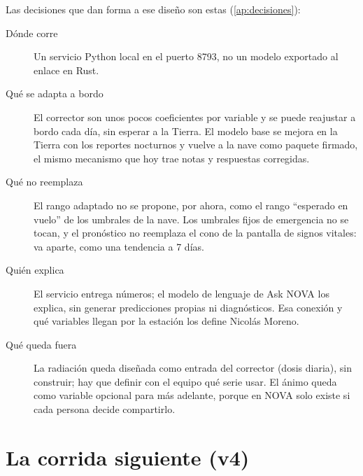 Las decisiones que dan forma a ese diseño son estas (\cref{ap:decisiones}):
\begin{description}
\item[Dónde corre] Un servicio Python local en el puerto 8793, no un modelo exportado al enlace en Rust.
\item[Qué se adapta a bordo] El corrector son unos pocos coeficientes por variable y se puede reajustar a bordo cada
  día, sin esperar a la Tierra. El modelo base se mejora en la Tierra con los reportes nocturnos y vuelve a la nave
  como paquete firmado, el mismo mecanismo que hoy trae notas y respuestas corregidas.
\item[Qué no reemplaza] El rango adaptado no se propone, por ahora, como el rango \enquote{esperado en vuelo} de los
  umbrales de la nave. Los umbrales fijos de emergencia no se tocan, y el pronóstico no reemplaza el cono de la
  pantalla de signos vitales: va aparte, como una tendencia a 7 días.
\item[Quién explica] El servicio entrega números; el modelo de lenguaje de Ask NOVA los explica, sin generar
  predicciones propias ni diagnósticos. Esa conexión y qué variables llegan por la estación los define Nicolás Moreno.
\item[Qué queda fuera] La radiación queda diseñada como entrada del corrector (dosis diaria), sin construir; hay que
  definir con el equipo qué serie usar. El ánimo queda como variable opcional para más adelante, porque en NOVA solo
  existe si cada persona decide compartirlo.
\end{description}

\section{La corrida siguiente (v4)}\label{sec:v4}


